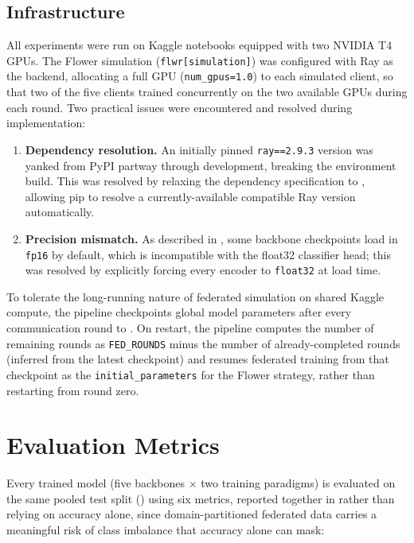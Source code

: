 \subsection{Infrastructure}

All experiments were run on Kaggle notebooks equipped with two NVIDIA T4 GPUs. The Flower simulation (\texttt{flwr[simulation]}) was configured with Ray as the backend, allocating a full GPU (\texttt{num\_gpus=1.0}) to each simulated client, so that two of the five clients trained concurrently on the two available GPUs during each round. Two practical issues were encountered and resolved during implementation:

\begin{enumerate}
    \item \textbf{Dependency resolution.} An initially pinned \texttt{ray==2.9.3} version was yanked from PyPI partway through development, breaking the environment build. This was resolved by relaxing the dependency specification to , allowing pip to resolve a currently-available compatible Ray version automatically.
    \item \textbf{Precision mismatch.} As described in , some backbone checkpoints load in \texttt{fp16} by default, which is incompatible with the float32 classifier head; this was resolved by explicitly forcing every encoder to \texttt{float32} at load time.
\end{enumerate}

To tolerate the long-running nature of federated simulation on shared Kaggle compute, the pipeline checkpoints global model parameters after every communication round to . On restart, the pipeline computes the number of remaining rounds as \texttt{FED\_ROUNDS} minus the number of already-completed rounds (inferred from the latest checkpoint) and resumes federated training from that checkpoint as the \texttt{initial\_parameters} for the Flower strategy, rather than restarting from round zero.

\section{Evaluation Metrics}
\label{sec:metrics}

Every trained model (five backbones $\times$ two training paradigms) is evaluated on the same pooled test split () using six metrics, reported together in  rather than relying on accuracy alone, since domain-partitioned federated data carries a meaningful risk of class imbalance that accuracy alone can mask:

